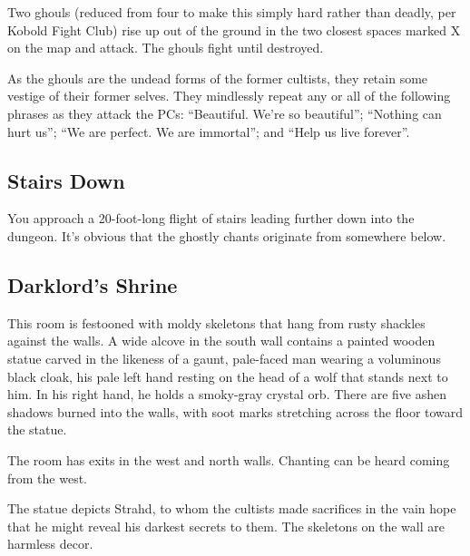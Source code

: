 Two ghouls (reduced from four to make this simply hard rather than deadly, per Kobold Fight Club) rise up
out of the ground in the two closest spaces marked X on the map and attack. The ghouls fight until destroyed.

As the ghouls are the undead forms of the former cultists, they retain some vestige of their former selves.
They mindlessly repeat any or all of the following phrases as they attack the PCs: ``Beautiful. We're so
beautiful''; ``Nothing can hurt us''; ``We are perfect. We are immortal''; and ``Help us live forever''.

\begin{arealinks}
\end{arealinks}


\pagebreak
\subsection{Stairs Down}
\label{sec:StairsDown}
\begin{readout}
  You approach a 20-foot-long flight of stairs leading further down into the dungeon. It's obvious that the
  ghostly chants originate from somewhere below.
\end{readout}

\begin{arealinks}
\end{arealinks}


\pagebreak
\subsection{Darklord's Shrine}
\label{sec:DarklordsShrine}
\begin{readout}
  This room is festooned with moldy skeletons that hang from rusty shackles against the walls. A wide alcove
  in the south wall contains a painted wooden statue carved in the likeness of a gaunt, pale-faced man wearing
  a voluminous black cloak, his pale left hand resting on the head of a wolf that stands next to him. In his
  right hand, he holds a smoky-gray crystal orb. There are five ashen shadows burned into the walls, with soot
  marks stretching across the floor toward the statue.
  
  The room has exits in the west and north walls. Chanting can be heard coming from the west.
\end{readout}
The statue depicts Strahd, to whom the cultists made sacrifices in the vain hope that he might reveal his
darkest secrets to them. The skeletons on the wall are harmless decor.

